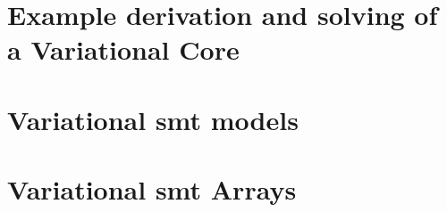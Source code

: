 \section{Example derivation and solving of a Variational Core}


\section{Variational \ac{smt} models}


\section{Variational \ac{smt} Arrays}



